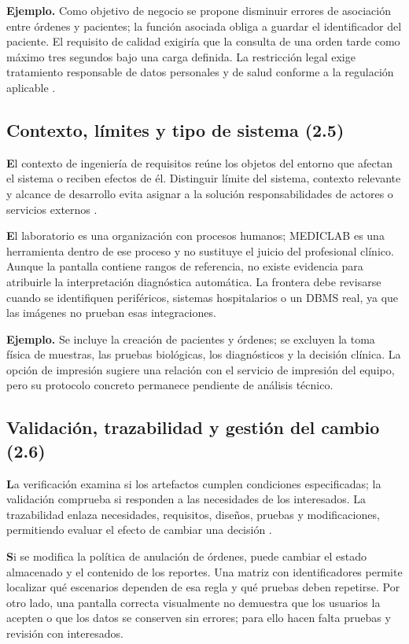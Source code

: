 \textbf{Ejemplo.} Como objetivo de negocio se propone disminuir errores de asociación entre órdenes y pacientes; la función asociada obliga a guardar el identificador del paciente. El requisito de calidad exigiría que la consulta de una orden tarde como máximo tres segundos bajo una carga definida. La restricción legal exige tratamiento responsable de datos personales y de salud conforme a la regulación aplicable \cite{lopdp2021}.

\subsection{Contexto, límites y tipo de sistema (2.5)}
\textbf El contexto de ingeniería de requisitos reúne los objetos del entorno que afectan el sistema o reciben efectos de él. Distinguir límite del sistema, contexto relevante y alcance de desarrollo evita asignar a la solución responsabilidades de actores o servicios externos \cite{pohl2025}.

\textbf El laboratorio es una organización con procesos humanos; MEDICLAB es una herramienta dentro de ese proceso y no sustituye el juicio del profesional clínico. Aunque la pantalla contiene rangos de referencia, no existe evidencia para atribuirle la interpretación diagnóstica automática. La frontera debe revisarse cuando se identifiquen periféricos, sistemas hospitalarios o un DBMS real, ya que las imágenes no prueban esas integraciones.

\textbf{Ejemplo.} Se incluye la creación de pacientes y órdenes; se excluyen la toma física de muestras, las pruebas biológicas, los diagnósticos y la decisión clínica. La opción de impresión sugiere una relación con el servicio de impresión del equipo, pero su protocolo concreto permanece pendiente de análisis técnico.

\subsection{Validación, trazabilidad y gestión del cambio (2.6)}
\textbf La verificación examina si los artefactos cumplen condiciones especificadas; la validación comprueba si responden a las necesidades de los interesados. La trazabilidad enlaza necesidades, requisitos, diseños, pruebas y modificaciones, permitiendo evaluar el efecto de cambiar una decisión \cite{iso29148,swebok2024}.

\textbf Si se modifica la política de anulación de órdenes, puede cambiar el estado almacenado y el contenido de los reportes. Una matriz con identificadores permite localizar qué escenarios dependen de esa regla y qué pruebas deben repetirse. Por otro lado, una pantalla correcta visualmente no demuestra que los usuarios la acepten o que los datos se conserven sin errores; para ello hacen falta pruebas y revisión con interesados.

